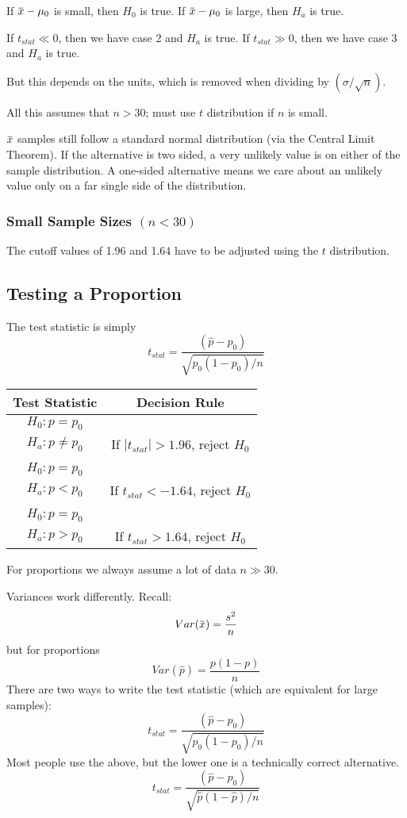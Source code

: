 \documentclass[11pt, oneside]{article}   	%
\newcommand{\overbar}[1]{\mkern 1.5mu\overline{\mkern-1.5mu#1\mkern-1.5mu}\mkern 1.5mu}
\begin{document}
If $\overbar{x} - \mu_0$ is small, then $H_0$ is true. If $\overbar{x} - \mu_0$ is large, then $H_a$ is true.

If $t_{stat}  \ll 0$, then we have case 2 and $H_a$ is true. If $t_{stat} \gg 0$, then we have case 3 and $H_a$ is true.

But this depends on the units, which is removed when dividing by $(\sigma / \sqrt{n})$.

All this assumes that $n > 30$; must use $t$ distribution if $n$ is small.

$\overbar{x}$ samples still follow a standard normal distribution (via the Central Limit Theorem). If the alternative is two sided, a very unlikely value is on either of the sample distribution. A one-sided alternative means we care about an unlikely value only on a far single side of the distribution.

\subsubsection{Small Sample Sizes $(n < 30)$}

The cutoff values of 1.96 and 1.64 have to be adjusted using the $t$ distribution.

\subsection{Testing a Proportion}

The test statistic is simply
\[
t_{stat} = \frac{(\hat{p} - p_0)}{\sqrt{p_0(1-p_0)/n}}
\]

\begin{tabular}{ c  c }
Test Statistic & Decision Rule \\
\hline
$H_0 : p = p_0$ \\      $H_a : p \neq p_0$ & If $|t_{stat}| > 1.96$, reject $H_0$ \\
 & \\
$H_0 : p = p_0$  \\ $H_a : p < p_0$      & If $t_{stat} < -1.64$, reject $H_0$ \\
 & \\
$H_0 : p = p_0$ \\ $H_a : p > p_0$      & If $t_{stat} > 1.64$, reject $H_0$ \\
\end{tabular}

For proportions we always assume a lot of data $n \gg 30$.

Variances work differently. Recall:
\[
Var(\overbar{x}) = \frac {s^2} {n}
\]
but for proportions
\[
Var(\hat{p}) = \frac{p(1-p) } {n } 
\]
There are two ways to write the test statistic (which are equivalent for large samples):
\[
t_{stat} = \frac{(\hat{p} - p_0)}{\sqrt{p_0(1-p_0)/n}}
\]
Most people use the above, but the lower one is a technically correct alternative.
\[
t_{stat} = \frac{(\hat{p} - p_0)}{\sqrt{\hat{p}(1-\hat{p})/n}}
\]
\end{document}
